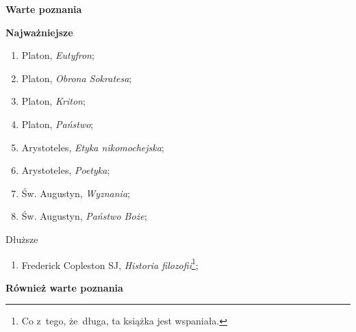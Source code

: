 \documentclass[a4paper,11pt]{article}
\newcommand{\spaceOne}{1.5em}
\newcommand{\spaceTwo}{1em}
\newcommand{\tb}{\textbf}
\newcommand{\Center}[1]{\begin{center} #1 \end{center}}
\newcommand{\Main}[1]{ \begin{center} {\LARGE \tb{#1} } \end{center} }
\newcommand{\Field}[1]{ \begin{center} {\Large \tb{#1} } \end{center} }
\begin{document}



\Main{Warte poznania}



\Field{Najważniejsze} %


\begin{enumerate}
\item Platon, \emph{Eutyfron};
\item Platon, \emph{Obrona Sokratesa};
\item Platon, \emph{Kriton};
\item Platon, \emph{Państwo};
\item Arystoteles, \emph{Etyka nikomochejska};
\item Arystoteles, \emph{Poetyka};
\item Św. Augustyn, \emph{Wyznania};
\item Św. Augustyn, \emph{Państwo Boże};
\end{enumerate}

\vspace{\spaceTwo}



\Center{Dłuższe} %


\begin{enumerate}
\item Frederick Copleston SJ, \emph{Historia filozofii}\footnote{Co
    z~tego, że~długa, ta książka jest wspaniała.};
\end{enumerate}

\vspace{\spaceTwo}



\Field{Również warte poznania}
\end{document}
